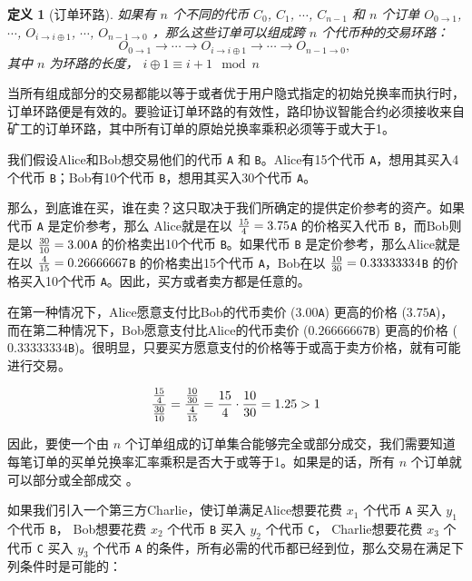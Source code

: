 \documentclass[UTF8]{ctexart}
\newtheorem{definition}{定义}[section]
\begin{document}
\begin{multicols}{2}
\begin{definition}[订单环路] 如果有 $n$ 个不同的代币 $C_{0}$, $C_{1}$, $\cdots$, $C_{n-1}$ 和  $n$ 个订单  $O_{0\rightarrow 1}$, $\cdots$, $O_{i\rightarrow i\oplus 1}$, $\cdots$, $O_{n-1 \rightarrow 0}$ ，那么这些订单可以组成跨 $n$ 个代币种的交易环路：
$$O_{0\rightarrow 1} \rightarrow \cdots \rightarrow O_{i\rightarrow i\oplus 1} \rightarrow \cdots \rightarrow O_{n-1\rightarrow 0} \text{, }$$
其中 $n$ 为环路的长度， $i\oplus 1 \equiv i+1 \mod n$ 
\end{definition}

当所有组成部分的交易都能以等于或者优于用户隐式指定的初始兑换率而执行时，订单环路便是有效的。要验证订单环路的有效性，路印协议智能合约必须接收来自矿工的订单环路，其中所有订单的原始兑换率乘积必须等于或大于1。

我们假设Alice和Bob想交易他们的代币 \verb|A| 和 \verb|B|。Alice有15个代币 \verb|A|，想用其买入4个代币 \verb|B|；Bob有10个代币 \verb|B|，想用其买入30个代币 \verb|A|。

那么，到底谁在买，谁在卖？这只取决于我们所确定的提供定价参考的资产。如果代币 \verb|A| 是定价参考，那么 Alice就是在以 ${15 \over 4} = 3.75$\verb|A| 的价格买入代币 \verb|B|，而Bob则是以 ${30 \over 10} = 3.00$\verb|A| 的价格卖出10个代币 \verb|B|。如果代币 \verb|B| 是定价参考，那么Alice就是在以 ${4\over 15}=0.26666667$\verb|B| 的价格卖出15个代币 \verb|A|，Bob在以 ${10 \over 30}=0.33333334$\verb|B| 的价格买入10个代币 \verb|A|。因此，买方或者卖方都是任意的。

在第一种情况下，Alice愿意支付比Bob的代币卖价 ($3.00$\verb|A|) 更高的价格 ($3.75$\verb|A|)，而在第二种情况下，Bob愿意支付比Alice的代币卖价 ($0.26666667$\verb|B|) 更高的价格 ($0.33333334$\verb|B|)。很明显，只要买方愿意支付的价格等于或高于卖方价格，就有可能进行交易。

\begin{equation}
{{15\over 4} \over {30\over 10}} = {{10\over 30} \over {4\over 15}}={15 \over 4} \cdot {10 \over 30} = 1.25 > 1
\end{equation}

因此，要使一个由 $n$ 个订单组成的订单集合能够完全或部分成交，我们需要知道每笔订单的买单兑换率汇率乘积是否大于或等于1。如果是的话，所有 $n$ 个订单就可以部分或全部成交 \cite{supersymmetry}。

如果我们引入一个第三方Charlie，使订单满足Alice想要花费 $x_1$ 个代币 \verb|A| 买入 $y_1$ 个代币 \verb|B|， Bob想要花费 $x_2$ 个代币 \verb|B| 买入 $y_2$ 个代币 \verb|C|， Charlie想要花费 $x_3$ 个代币 \verb|C| 买入  $y_3$ 个代币 \verb|A| 的条件，所有必需的代币都已经到位，那么交易在满足下列条件时是可能的：


\end{multicols}
\end{document}
